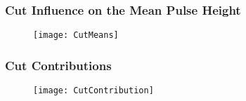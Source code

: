 \begin{frame}
	\frametitle{Cut Influence on the Mean Pulse Height}
	\begin{figure}
		\centering
		\texttt{[image: CutMeans]}
	\end{figure}
\end{frame}
\begin{frame}
	\frametitle{Cut Contributions}
	\vspace*{-17pt}
	\begin{figure}
		\centering
		\texttt{[image: CutContribution]}
	\end{figure}
\end{frame}

